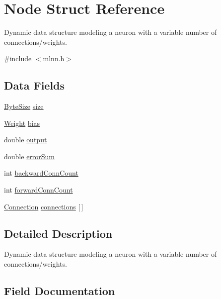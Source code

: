 \hypertarget{struct_node}{}\section{Node Struct Reference}
\label{struct_node}


Dynamic data structure modeling a neuron with a variable number of connections/weights.  




{\ttfamily \#include $<$mlnn.\+h$>$}

\subsection*{Data Fields}
\begin{DoxyCompactItemize}
\item 
\hyperlink{mlnn_8h_a7a4b57eb083e961719b18441711d8ee5}{Byte\+Size} \hyperlink{struct_node_aab34baa6cb3e7bebfb7f4ba88a0ffbda}{size}
\item 
\hyperlink{mlnn_8h_a5b53e5716aeadbb040a52c9c8c124c74}{Weight} \hyperlink{struct_node_ad44b9b54f0b17c39aed411e4fd53bd65}{bias}
\item 
double \hyperlink{struct_node_a47943f73244ca117fa9bf9234cbed317}{output}
\item 
double \hyperlink{struct_node_a0ffb8762677eef2369816a899636b44f}{error\+Sum}
\item 
int \hyperlink{struct_node_a869b3dfcdb29befb43ba4fd88cfb4ff8}{backward\+Conn\+Count}
\item 
int \hyperlink{struct_node_a498c0b6b6fb05b96b32c23d8fa021cf3}{forward\+Conn\+Count}
\item 
\hyperlink{struct_connection}{Connection} \hyperlink{struct_node_a97eb8879b8aa05ba1d09440be3ba1f96}{connections} \mbox{[}$\,$\mbox{]}
\end{DoxyCompactItemize}


\subsection{Detailed Description}
Dynamic data structure modeling a neuron with a variable number of connections/weights. 

\subsection{Field Documentation}
\hypertarget{struct_node_a869b3dfcdb29befb43ba4fd88cfb4ff8}{}

